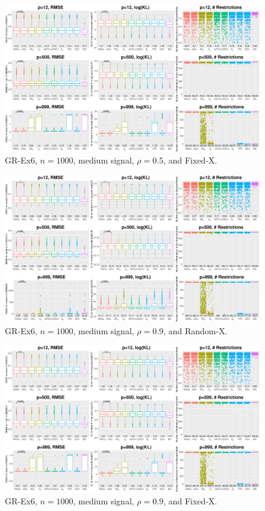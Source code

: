 \begin{figure}[!ht]
\centering
\includegraphics[width=\textwidth]{figures/supplement/fixedx_GR-Ex6_n1000_msnr_rho05.eps}
\caption{GR-Ex6, $n=1000$, medium signal, $\rho=0.5$, and Fixed-X.}
\end{figure}
\clearpage
\begin{figure}[!ht]
\centering
\includegraphics[width=\textwidth]{figures/supplement/randomx_GR-Ex6_n1000_msnr_rho09.eps}
\caption{GR-Ex6, $n=1000$, medium signal, $\rho=0.9$, and Random-X.}
\end{figure}
\begin{figure}[!ht]
\centering
\includegraphics[width=\textwidth]{figures/supplement/fixedx_GR-Ex6_n1000_msnr_rho09.eps}
\caption{GR-Ex6, $n=1000$, medium signal, $\rho=0.9$, and Fixed-X.}
\end{figure}
